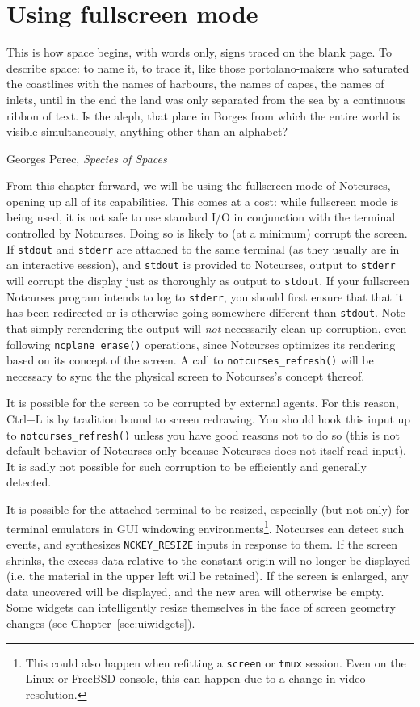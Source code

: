 \documentclass[letterpaper,10pt]{article}
\begin{document}
\section{Using fullscreen mode}
\label{sec:fullscreen}
\epigraph{This is how space begins, with words only, signs traced on the blank page. To describe space: to name it, to trace it, like those portolano-makers who saturated the coastlines with the names of harbours, the names of capes, the names of inlets, until in the end the land was only separated from the sea by a continuous ribbon of text. Is the aleph, that place in Borges from which the entire world is visible simultaneously, anything other than an alphabet?}{Georges Perec, \textit{Species of Spaces}}
From this chapter forward, we will be using the fullscreen mode of Notcurses,
opening up all of its capabilities. This comes at a cost: while fullscreen mode
is being used, it is not safe to use standard I/O in conjunction with the
terminal controlled by Notcurses. Doing so is likely to (at a minimum) corrupt
the screen. If \texttt{stdout} and \texttt{stderr} are attached to the same
terminal (as they usually are in an interactive session), and \texttt{stdout}
is provided to Notcurses, output to \texttt{stderr} will corrupt the display
just as thoroughly as output to \texttt{stdout}. If your fullscreen Notcurses
program intends to log to \texttt{stderr}, you should first ensure that that
it has been redirected or is otherwise going somewhere different than
\texttt{stdout}. Note that simply rerendering the output will \textit{not}
necessarily clean up corruption, even following \texttt{ncplane\_erase()}
operations, since Notcurses optimizes its rendering based on its concept of the
screen. A call to \texttt{notcurses\_refresh()} will be necessary to sync the
the physical screen to Notcurses's concept thereof.

It is possible for the screen to be corrupted by external agents. For this
reason, Ctrl+L is by tradition bound to screen redrawing. You should hook this
input up to \texttt{notcurses\_refresh()} unless you have good reasons not to
do so (this is not default behavior of Notcurses only because Notcurses does
not itself read input). It is sadly not possible for such corruption to be
efficiently and generally detected.

It is possible for the attached terminal to be resized, especially (but not
only) for terminal emulators in GUI windowing environments\footnote{This could
also happen when refitting a \texttt{screen} or \texttt{tmux} session.
Even on the Linux or FreeBSD console, this can happen due to a change in video
resolution.}. Notcurses can detect such events, and synthesizes
\texttt{NCKEY\_RESIZE} inputs in response to them. If the screen shrinks, the
excess data relative to the constant origin will no longer be displayed (i.e.
the material in the upper left will be retained). If the screen is enlarged,
any data uncovered will be displayed, and the new area will otherwise be empty.
Some widgets can intelligently resize themselves in the face of screen
geometry changes (see Chapter~\ref{sec:uiwidgets}).
\end{document}

